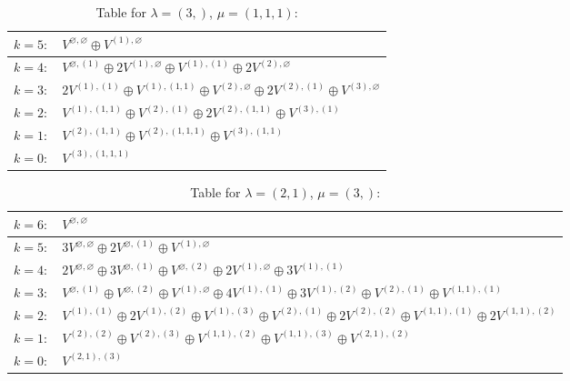 \documentclass[a4paper,12pt]{article}
\begin{document}
\renewcommand{\arraystretch}{1.6} 
\begin{table}[H]
\centering
\caption{Table for $\lambda = (3,)$, $\mu = (1, 1, 1)$:}
\begin{tabular}{|>{\centering\arraybackslash}p{15cm}|}
\hline
 $k = 5: \quad V^{\varnothing, \varnothing} \oplus V^{(1), \varnothing} $ \\ \hline
 $k = 4: \quad V^{\varnothing, (1)} \oplus 2 V^{(1), \varnothing} \oplus V^{(1), (1)} \oplus 2 V^{(2), \varnothing} $ \\ \hline
 $k = 3: \quad 2 V^{(1), (1)} \oplus V^{(1), (1, 1)} \oplus V^{(2), \varnothing} \oplus 2 V^{(2), (1)} \oplus V^{(3), \varnothing} $ \\ \hline
 $k = 2: \quad V^{(1), (1, 1)} \oplus V^{(2), (1)} \oplus 2 V^{(2), (1, 1)} \oplus V^{(3), (1)} $ \\ \hline
 $k = 1: \quad V^{(2), (1, 1)} \oplus V^{(2), (1, 1, 1)} \oplus V^{(3), (1, 1)} $ \\ \hline
 $k = 0: \quad V^{(3), (1, 1, 1)} $ \\ \hline
\end{tabular}
\end{table}

\renewcommand{\arraystretch}{1.6} 
\begin{table}[H]
\centering
\caption{Table for $\lambda = (2, 1)$, $\mu = (3,)$:}
\begin{tabular}{|>{\centering\arraybackslash}p{15cm}|}
\hline
 $k = 6: \quad V^{\varnothing, \varnothing} $ \\ \hline
 $k = 5: \quad 3 V^{\varnothing, \varnothing} \oplus 2 V^{\varnothing, (1)} \oplus V^{(1), \varnothing} $ \\ \hline
 $k = 4: \quad 2 V^{\varnothing, \varnothing} \oplus 3 V^{\varnothing, (1)} \oplus V^{\varnothing, (2)} \oplus 2 V^{(1), \varnothing} \oplus 3 V^{(1), (1)} $ \\ \hline
 $k = 3: \quad V^{\varnothing, (1)} \oplus V^{\varnothing, (2)} \oplus V^{(1), \varnothing} \oplus 4 V^{(1), (1)} \oplus 3 V^{(1), (2)} \oplus V^{(2), (1)} \oplus V^{(1, 1), (1)} $ \\ \hline
 $k = 2: \quad V^{(1), (1)} \oplus 2 V^{(1), (2)} \oplus V^{(1), (3)} \oplus V^{(2), (1)} \oplus 2 V^{(2), (2)} \oplus V^{(1, 1), (1)} \oplus 2 V^{(1, 1), (2)} $ \\ \hline
 $k = 1: \quad V^{(2), (2)} \oplus V^{(2), (3)} \oplus V^{(1, 1), (2)} \oplus V^{(1, 1), (3)} \oplus V^{(2, 1), (2)} $ \\ \hline
 $k = 0: \quad V^{(2, 1), (3)} $ \\ \hline
\end{tabular}
\end{table}
\end{document}
